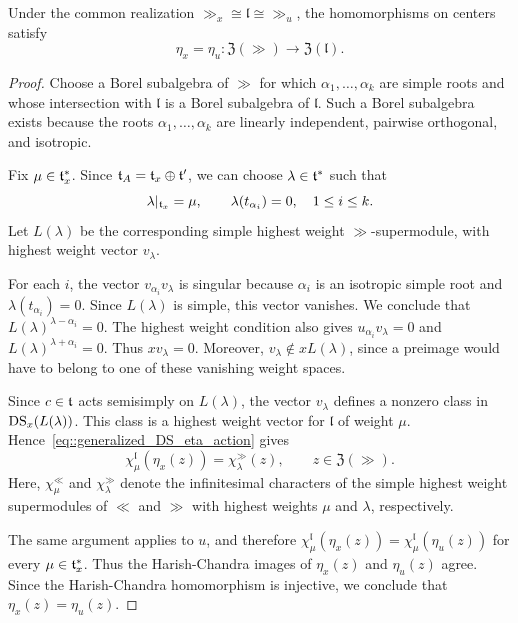\begin{lemma}\label{lem::generalized_DS_eta_compatibility}
Under the common realization $\gg_x\cong\mathfrak{l}\cong\gg_u$, the homomorphisms on centers satisfy
\begin{equation*}
\eta_x=\eta_u:
\mathfrak{Z}(\gg)\longrightarrow\mathfrak{Z}(\mathfrak{l}).
\end{equation*}
\end{lemma}

\begin{proof}
Choose a Borel subalgebra of $\gg$ for which $\alpha_1,\ldots,\alpha_k$ are simple roots and whose intersection with $\mathfrak{l}$ is a Borel subalgebra of $\mathfrak{l}$. Such a Borel subalgebra exists because the roots $\alpha_1,\ldots,\alpha_k$ are linearly independent, pairwise orthogonal, and isotropic.

Fix $\mu\in\tt_x^{\ast}$. Since $\tt_{A}=\tt_x\oplus\tt'$, we can choose $\lambda\in\tt^{\ast}$ such that
\begin{equation*}
\lambda|_{\tt_x}=\mu,
\qquad
\lambda(t_{\alpha_i})=0,
\quad 1\leq i\leq k.
\end{equation*}
Let $L(\lambda)$ be the corresponding simple highest weight $\gg$-supermodule, with highest weight vector $v_\lambda$.

For each $i$, the vector $v_{\alpha_i}v_\lambda$ is singular because $\alpha_i$ is an isotropic simple root and $\lambda(t_{\alpha_i})=0$. Since $L(\lambda)$ is simple, this vector vanishes. We conclude that
$
L(\lambda)^{\lambda-\alpha_i}=0.
$
The highest weight condition also gives
$
u_{\alpha_i}v_\lambda=0
$
and
$
L(\lambda)^{\lambda+\alpha_i}=0.
$
Thus $xv_\lambda=0$. Moreover, $v_\lambda\notin xL(\lambda)$, since a preimage would have to belong to one of these vanishing weight spaces.

Since $c\in\tt$ acts semisimply on $L(\lambda)$, the vector $v_\lambda$ defines a nonzero class in $\DS_x(L(\lambda))$. This class is a highest weight vector for $\mathfrak{l}$ of weight $\mu$. Hence~\eqref{eq::generalized_DS_eta_action} gives
\begin{equation*}
\chi_\mu^{\mathfrak{l}}(\eta_x(z))
=
\chi_\lambda^\gg(z),
\qquad
z\in\mathfrak{Z}(\gg).
\end{equation*}
Here, $\chi_\mu^{\ll}$ and $\chi_\lambda^{\gg}$ denote the infinitesimal characters of the simple highest weight supermodules of $\ll$ and $\gg$ with highest weights $\mu$ and $\lambda$, respectively. 

The same argument applies to $u$, and therefore
$
\chi_\mu^{\mathfrak{l}}(\eta_x(z))
=
\chi_\mu^{\mathfrak{l}}(\eta_u(z))
$
for every $\mu\in\tt_x^{\ast}$. Thus the Harish-Chandra images of $\eta_x(z)$ and $\eta_u(z)$ agree. Since the Harish-Chandra homomorphism is injective, we conclude that $\eta_x(z)=\eta_u(z)$.
\end{proof}

